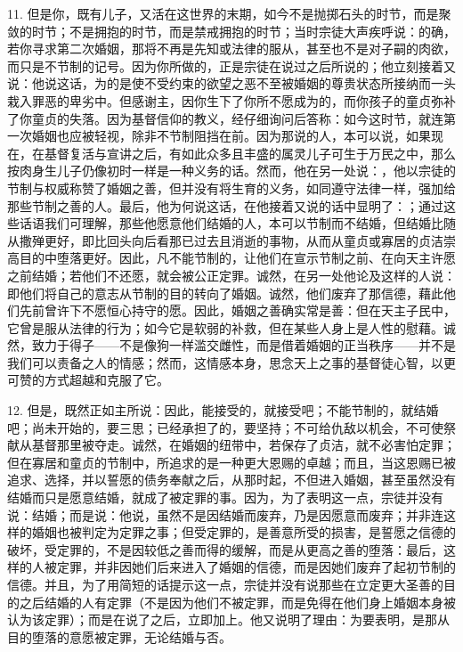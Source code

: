 11. 但是你，既有儿子，又活在这世界的末期，如今不是抛掷石头的时节，而是聚敛的时节；不是拥抱的时节，而是禁戒拥抱的时节；当时宗徒大声疾呼说：的确，若你寻求第二次婚姻，那将不再是先知或法律的服从，甚至也不是对子嗣的肉欲，而只是不节制的记号。因为你所做的，正是宗徒在说过之后所说的；他立刻接着又说：他说这话，为的是使不受约束的欲望之恶不至被婚姻的尊贵状态所接纳而一头栽入罪恶的卑劣中。但感谢主，因你生下了你所不愿成为的，而你孩子的童贞弥补了你童贞的失落。因为基督信仰的教义，经仔细询问后答称：如今这时节，就连第一次婚姻也应被轻视，除非不节制阻挡在前。因为那说的人，本可以说，如果现在，在基督复活与宣讲之后，有如此众多且丰盛的属灵儿子可生于万民之中，那么按肉身生儿子仍像初时一样是一种义务的话。然而，他在另一处说：，他以宗徒的节制与权威称赞了婚姻之善，但并没有将生育的义务，如同遵守法律一样，强加给那些节制之善的人。最后，他为何说这话，在他接着又说的话中显明了：；通过这些话语我们可理解，那些他愿意他们结婚的人，本可以节制而不结婚，但结婚比随从撒殚更好，即比回头向后看那已过去且消逝的事物，从而从童贞或寡居的贞洁崇高目的中堕落更好。因此，凡不能节制的，让他们在宣示节制之前、在向天主许愿之前结婚；若他们不还愿，就会被公正定罪。诚然，在另一处他论及这样的人说：即他们将自己的意志从节制的目的转向了婚姻。诚然，他们废弃了那信德，藉此他们先前曾许下不愿恒心持守的愿。因此，婚姻之善确实常是善：但在天主子民中，它曾是服从法律的行为；如今它是软弱的补救，但在某些人身上是人性的慰藉。诚然，致力于得子——不是像狗一样滥交雌性，而是借着婚姻的正当秩序——并不是我们可以责备之人的情感；然而，这情感本身，思念天上之事的基督徒心智，以更可赞的方式超越和克服了它。\par

12. 但是，既然正如主所说：因此，能接受的，就接受吧；不能节制的，就结婚吧；尚未开始的，要三思；已经承担了的，要坚持；不可给仇敌以机会，不可使祭献从基督那里被夺走。诚然，在婚姻的纽带中，若保存了贞洁，就不必害怕定罪；但在寡居和童贞的节制中，所追求的是一种更大恩赐的卓越；而且，当这恩赐已被追求、选择，并以誓愿的债务奉献之后，从那时起，不但进入婚姻，甚至虽然没有结婚而只是愿意结婚，就成了被定罪的事。因为，为了表明这一点，宗徒并没有说：结婚；而是说：他说，虽然不是因结婚而废弃，乃是因愿意而废弃；并非连这样的婚姻也被判定为定罪之事；但受定罪的，是善意所受的损害，是誓愿之信德的破坏，受定罪的，不是因较低之善而得的缓解，而是从更高之善的堕落：最后，这样的人被定罪，并非因她们后来进入了婚姻的信德，而是因她们废弃了起初节制的信德。并且，为了用简短的话提示这一点，宗徒并没有说那些在立定更大圣善的目的之后结婚的人有定罪（不是因为他们不被定罪，而是免得在他们身上婚姻本身被认为该定罪）；而是在说了之后，立即加上。他又说明了理由：为要表明，是那从目的堕落的意愿被定罪，无论结婚与否。\par

